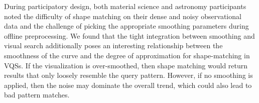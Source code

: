 \par During participatory design, both material science and astronomy participants noted the difficulty of shape matching on their dense and noisy observational data and the challenge of picking the appropriate smoothing parameters during offline preprocessing. We found that the tight integration between smoothing and visual search additionally poses an interesting relationship between the smoothness of the curve and the degree of approximation for shape-matching in VQSs. If the visualization is over-smoothed, then shape matching would return results that only loosely resemble the query pattern. However, if no smoothing is applied, then the noise may dominate the overall trend, which could also lead to bad pattern matches.

